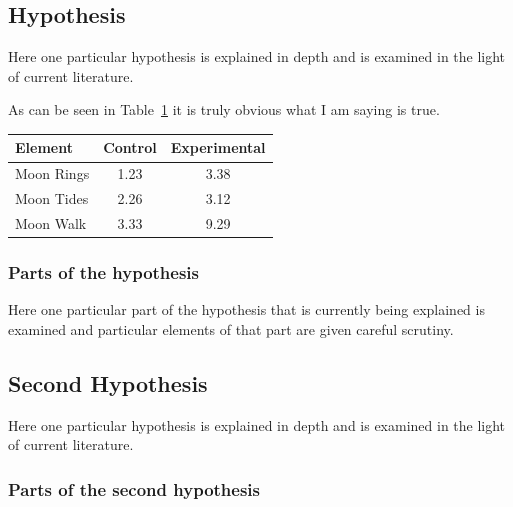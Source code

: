 \documentclass[11pt]{isuthesis}
\begin{document}
\subsection{Hypothesis}

Here one particular hypothesis is explained in depth
and is examined in the light of current literature.

As can be seen in Table~\ref{nothingelse} it is
truly obvious what I am saying is true.

\begin{table} \centering
{}
\label{nothingelse}
\begin{tabular}{lcc} \hline
\textbf{Element} & \textbf{Control} & \textbf{Experimental} \\ \hline
Moon Rings & 1.23 & 3.38 \\
Moon Tides & 2.26 & 3.12 \\
Moon Walk & 3.33 & 9.29 \\ \hline
\end{tabular}
\end{table}

\subsubsection{Parts of the hypothesis}

Here one particular part of the hypothesis that is 
currently being explained is examined and particular
elements of that part are given careful scrutiny.


\subsection{Second Hypothesis}

Here one particular hypothesis is explained in depth
and is examined in the light of current literature.

\subsubsection{Parts of the second hypothesis}
\end{document}
